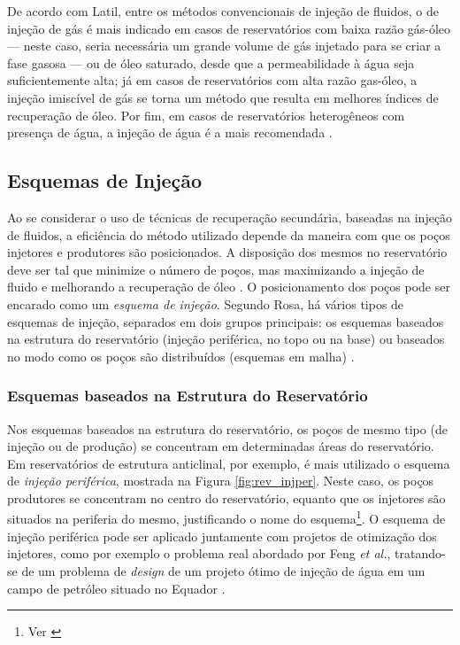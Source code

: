 De acordo com Latil, entre os m\'{e}todos convencionais de inje\c{c}\~{a}o de fluidos, o de inje\c{c}\~{a}o de g\'{a}s \'{e} mais indicado em casos de reservat\'{o}rios com baixa raz\~{a}o g\'{a}s-\'{o}leo --- neste caso, seria necess\'{a}ria um grande volume de g\'{a}s injetado para se criar a fase gasosa --- ou de \'{o}leo saturado, desde que a permeabilidade \`{a} \'{a}gua seja suficientemente alta; j\'{a} em casos de reservat\'{o}rios com alta raz\~{a}o gas-\'{o}leo, a inje\c{c}\~{a}o imisc\'{i}vel de g\'{a}s se torna um m\'{e}todo que resulta em melhores \'{i}ndices de recupera\c{c}\~{a}o de \'{o}leo. Por fim, em casos de reservat\'{o}rios heterog\^{e}neos com presen\c{c}a de \'{a}gua, a inje\c{c}\~{a}o de \'{a}gua \'{e} a mais recomendada \cite{latil}. 

\subsection{Esquemas de Inje\c{c}\~{a}o}

Ao se considerar o uso de t\'{e}cnicas de recupera\c{c}\~{a}o secund\'{a}ria, baseadas na inje\c{c}\~{a}o de fluidos, a efici\^{e}ncia do m\'{e}todo utilizado depende da maneira com que os po\c{c}os injetores e produtores s\~{a}o posicionados. A disposi\c{c}\~{a}o dos mesmos no reservat\'{o}rio deve ser tal que minimize o n\'{u}mero de po\c{c}os, mas maximizando a inje\c{c}\~{a}o de fluido e melhorando a recupera\c{c}\~{a}o de \'{o}leo \cite{dake}. O posicionamento dos po\c{c}os pode ser encarado como um \textit{esquema de inje\c{c}\~{a}o}. Segundo Rosa, h\'{a} v\'{a}rios tipos de esquemas de inje\c{c}\~{a}o, separados em dois grupos principais: os esquemas baseados na estrutura do reservat\'{o}rio (inje\c{c}\~{a}o perif\'{e}rica, no topo ou na base) ou baseados no modo como os po\c{c}os s\~{a}o distribu\'{i}dos (esquemas em malha) \cite[p. 564]{engres}.

\subsubsection{Esquemas baseados na Estrutura do Reservat\'{o}rio}
Nos esquemas baseados na estrutura do reservat\'{o}rio, os po\c{c}os de mesmo tipo (de inje\c{c}\~{a}o ou de produ\c{c}\~{a}o) se concentram em determinadas \'{a}reas do reservat\'{o}rio. Em reservat\'{o}rios de estrutura anticlinal, por exemplo, \'{e} mais utilizado o esquema de \textit{inje\c{c}\~{a}o perif\'{e}rica}, mostrada na Figura \ref{fig:rev_injper}. Neste caso, os po\c{c}os produtores se concentram no centro do reservat\'{o}rio, equanto que os injetores s\~{a}o situados na periferia do mesmo, justificando o nome do esquema\footnote{Ver \cite[p. 565]{engres}}. O esquema de inje\c{c}\~{a}o perif\'{e}rica pode ser aplicado juntamente com projetos de otimiza\c{c}\~{a}o dos injetores, como por exemplo o problema real abordado por Feng \textit{et al.}, tratando-se de um problema de \textit{design} de um projeto \'{o}timo de inje\c{c}\~{a}o de \'{a}gua em um campo de petr\'{o}leo situado no Equador \cite{feng2015}. 

